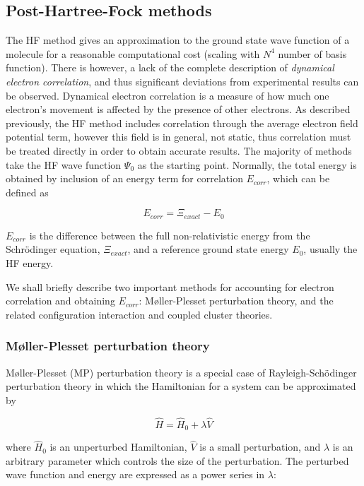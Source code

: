 \subsection{Post-Hartree-Fock methods}

The HF method gives an approximation to the ground state wave function of a molecule for a reasonable computational cost (scaling with $N^4$ number of basis function). There is however, a lack of the complete description of \emph{dynamical electron correlation},\cite{Cramer2004} and thus significant deviations from experimental results can be observed. Dynamical electron correlation is a measure of how much one electron's movement is affected by the presence of other electrons. As described previously, the HF method includes correlation through the average electron field potential term, however this field is in general, not static, thus correlation must be treated directly in order to obtain accurate results. The majority of methods take the HF wave function $\Psi_0$ as the starting point. Normally, the total energy is obtained by inclusion of an energy term for correlation $E_{corr}$, which can be defined as

\begin{equation}
  E_{corr} = \Xi_{exact} - E_0
\end{equation}

\noindent $E_{corr}$ is the difference between the full non-relativistic energy from the Schr{\"o}dinger equation, $\Xi_{exact}$, and a reference ground state energy $E_0$, usually the HF energy.

We shall briefly describe two important methods for accounting for electron correlation and obtaining $E_{corr}$: M{\o}ller-Plesset perturbation theory, and the related configuration interaction and coupled cluster theories.

\subsubsection{M{\o}ller-Plesset perturbation theory}

M{\o}ller-Plesset (MP) perturbation theory is a special case of Rayleigh-Sch{\"o}dinger perturbation theory in which the Hamiltonian for a system can be approximated by

\begin{equation}
  \hat{H} = \hat{H}_0 + \lambda\hat{V}
\end{equation}

\noindent where $\hat{H}_0$ is an unperturbed Hamiltonian, $\hat{V}$ is a small perturbation, and $\lambda$ is an arbitrary parameter which controls the size of the perturbation. The perturbed wave function and energy are expressed as a power series in $\lambda$:

